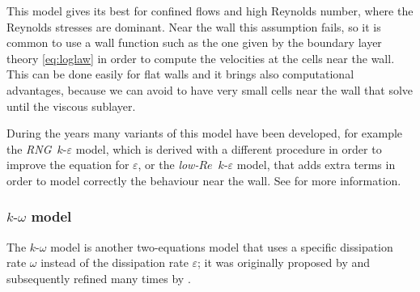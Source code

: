 This model gives its best for confined flows and high Reynolds number, where 
the Reynolds stresses are dominant. Near the wall this assumption fails, so it 
is common to use a wall function such as the one given by the boundary layer 
theory \eqref{eq:loglaw} in order to compute the velocities at the cells near 
the wall. This can be done easily for flat walls and it brings also 
computational advantages, because we can avoid to have very small cells near 
the wall that solve until the viscous sublayer.

During the years many variants of this model have been developed, for example 
the \emph{RNG}~$k\text{-}\varepsilon$ model, which is derived with a different 
procedure in order to improve the equation for
$\varepsilon$, or the \emph{low-$Re$}~$k\text{-}\varepsilon$ model, that 
adds extra terms in order to model correctly the behaviour near the wall. See 
\cite{main:vermal} for more information.
%
\subsubsection{$k\text{-}\omega$ model}
The $k\text{-}\omega$ model is another two-equations model that uses a specific 
dissipation rate $\omega$ instead of the dissipation rate $\varepsilon$; it was 
originally proposed by \textcite{komega:kolmo} and subsequently refined many 
times by \textcite{turbo:komega}.

